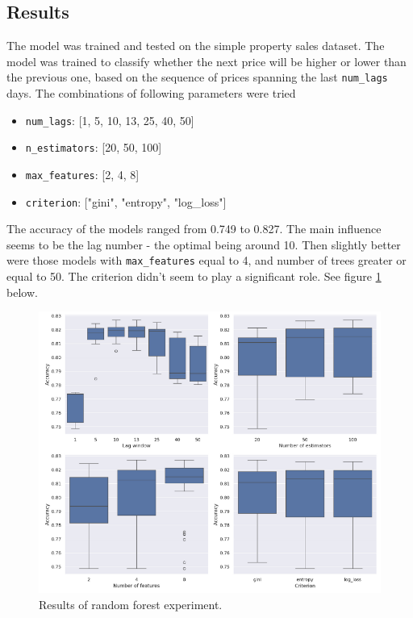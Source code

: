\subsection{Results}
The model was trained and tested on the simple property sales dataset.
The model was trained to classify whether the next price will be higher or lower than the previous one, based on the sequence of prices spanning the last \verb|num_lags| days.
The combinations of following parameters were tried

\noindent
\begin{itemize}
	\item \verb|num_lags|: [1, 5, 10, 13, 25, 40, 50]
	\item \verb|n_estimators|: [20, 50, 100]
	\item \verb|max_features|: [2, 4, 8]
	\item \verb|criterion|: ["gini", "entropy", "log\_loss"]
\end{itemize}

The accuracy of the models ranged from 0.749 to 0.827. The main influence seems to be the lag number - the optimal being around 10. Then slightly better were those models with \verb|max_features| equal to 4, and number of trees greater or equal to 50. The criterion didn't seem to play a significant role. See figure \ref{fig:random_forest_fig} below.

\begin{figure}[h!]
	\includegraphics[width=\linewidth]{"pictures/random_forest_results.png"}
	\caption{Results of random forest experiment.}
	\label{fig:random_forest_fig}
\end{figure}















